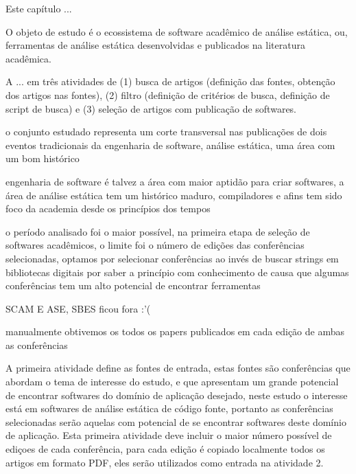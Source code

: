 {Este capítulo ... }
\label{metodologia}



O objeto de estudo é o ecossistema de software acadêmico de análise estática,
ou, ferramentas de análise estática desenvolvidas e publicados na literatura
acadêmica.

A ... em três atividades de (1) busca de artigos
(definição das fontes, obtenção dos artigos nas fontes), (2) filtro (definição
de critérios de busca, definição de script de busca) e (3) seleção de artigos
com publicação de softwares.

o conjunto estudado representa um corte transversal nas
publicações de dois eventos tradicionais da engenharia
de software, análise estática, uma área com um bom histórico

engenharia de software é talvez a área com maior aptidão
para criar softwares, a área de análise estática tem um
histórico maduro, compiladores e afins tem sido foco da
academia desde os princípios dos tempos

o período analisado foi o maior possível, na primeira etapa
de seleção de softwares acadêmicos, o limite foi o número de
edições das conferências selecionadas, optamos por selecionar
conferências ao invés de buscar strings em bibliotecas digitais
por saber a princípio com conhecimento de causa que algumas
conferências tem um alto potencial de encontrar ferramentas

SCAM E ASE, SBES ficou fora :'(

manualmente obtivemos os todos os papers publicados em cada edição
de ambas as conferências

A primeira atividade define as fontes de entrada,
estas fontes são conferências que abordam o tema de interesse do estudo, e
que apresentam um grande potencial de encontrar softwares do domínio de
aplicação desejado, neste estudo o interesse está em softwares de análise
estática de código fonte, portanto as conferências selecionadas serão
aquelas com potencial de se encontrar softwares deste domínio de aplicação.
Esta primeira atividade deve incluir o maior número possível de ediçoes de
cada conferência, para cada edição é copiado localmente todos os artigos em
formato PDF, eles serão utilizados como entrada na atividade 2.


